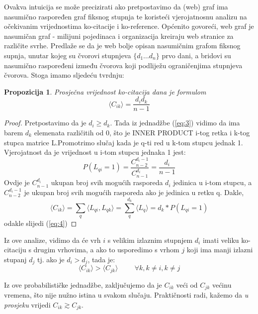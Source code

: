 \documentclass[11pt]{article}
\newtheorem{prop}{Propozicija} [section]
\begin{document}
Ovakva intuicija se može precizirati ako pretpostavimo da (web) graf ima nasumično raspoređen graf fiksnog stupnja te koristeći vjerojatnosnu analizu na očekivanim vrijednostima ko-citacije i ko-reference. 
Općenito govoreći, web graf je nasumičan graf - milijuni pojedinaca i organizacija kreiraju web stranice za različite svrhe. Predlaže se da je web bolje opisan nasumičnim grafom fiksnog supnja, unutar kojeg su čvorovi stupnjeva $\{d_{1} \ldots d_{n}\}$ prvo dani, a bridovi su nasumično raspoređeni između čvorova koji podliježu ograničenjima stupnjeva čvorova.
Stoga imamo sljedeću tvrdnju:
\begin{prop}
Prosječna vrijednost ko-citacija dana je formulom
\begin{equation} \label{eq:4}
\langle C_{ik}\rangle = \frac{d_{i}d_{k}}{n-1}
\end{equation}
\end{prop}
\begin{proof}
Pretpostavimo da je $d_{i} \geq d_{k}$. Tada iz jednadžbe (\ref{eq:3}) vidimo da ima barem $d_{k}$  elemenata različitih od 0, što je INNER PRODUCT i-tog retka i k-tog stupca matrice L.Promotrimo slučaj kada je q-ti red u k-tom stupcu jednak 1. Vjerojatnost da je vrijednost u i-tom stupcu jednaka 1 jest:
\begin{equation*}
    P(L_{qi} = 1) = \frac{C_{n-2}^{d_{i}-1}}{C_{n-1}^{d_{i}}} = \frac{d_{i}}{n-1}
\end{equation*}
Ovdje je $C_{n-1}^{d_{i}}$ ukupan broj svih mogućih rasporeda $d_{i}$ jedinica u i-tom stupcu, a $C_{n-2}^{d_{i}-1}$ je ukupan broj svih mogućih rasporeda ako je jedinica u retku q.
Dakle,
\begin{equation*}
    \langle C_{ik}\rangle = \sum_{q} \langle L_{qi}, L_{qk} \rangle= \sum_{q}^{d_{k}} \langle L_{q} \rangle = d_{k} * P(L_{qi} = 1)
\end{equation*}
odakle slijedi (\ref{eq:4})
\end{proof}

Iz ove analize, vidimo da će vrh $i$ s velikim izlaznim stupnjem $d_{i}$ imati veliku ko-citaciju s drugim vrhovima, a ako to usporedimo s vrhom $j$ koji ima manji izlazni stupanj $d_{j}$ tj. ako je $d_{i} > d_{j}$, tada je:
\begin{equation*}
    \langle C_{ik} \rangle > \langle C_{jk} \rangle  \hspace{1cm} \forall k, k \neq i, k \neq j
\end{equation*}

Iz ove probabilističke jednadžbe, zaključujemo da je $C_{ik}$ veći od $C_{jk}$ većinu vremena, što nije nužno istina u svakom slučaju.  
Praktičnosti radi, kažemo da \emph{u prosjeku} vrijedi $C_{ik} \gtrsim C_{jk}$.
\end{document}

